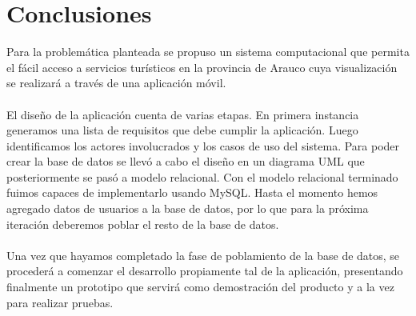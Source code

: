 \documentclass[12pt]{article}
\begin{document}
\section{Conclusiones}
Para la problemática planteada se propuso un sistema computacional que permita el fácil acceso a servicios turísticos en la provincia de Arauco cuya visualización se realizará a través de una aplicación móvil.\\\\
El diseño de la aplicación cuenta de varias etapas. En primera instancia generamos una lista de requisitos que debe cumplir la aplicación. Luego identificamos los actores involucrados y los casos de uso del sistema. Para poder crear la base de datos se llevó a cabo el diseño en un diagrama UML que posteriormente se pasó a modelo relacional. Con el modelo relacional terminado fuimos capaces de implementarlo usando MySQL. Hasta el momento hemos agregado datos de usuarios a la base de datos, por lo que para la próxima iteración deberemos poblar el resto de la base de datos.\\\\
Una vez que hayamos completado la fase de poblamiento de la base de datos, se procederá a comenzar el desarrollo propiamente tal de la aplicación, presentando finalmente un prototipo que servirá como demostración del producto y a la vez para realizar pruebas.
\end{document}
